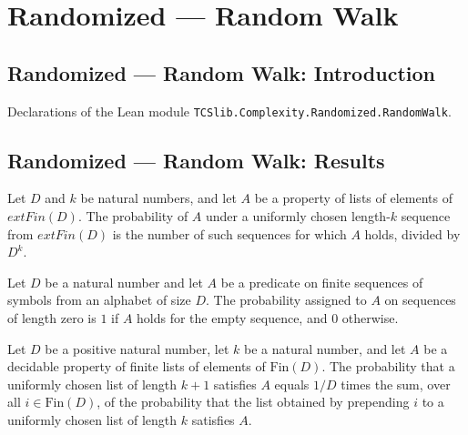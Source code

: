 \section{Randomized --- Random Walk}
\subsection*{Randomized --- Random Walk: Introduction}

Declarations of the Lean module \texttt{TCSlib.Complexity.Randomized.RandomWalk}.

\subsection*{Randomized --- Random Walk: Results}

\begin{definition}
\label{Randomized.idxProb}
\leanok
Let $D$ and $k$ be natural numbers, and let $A$ be a property of lists of elements of
$	ext{Fin}(D)$. The probability of $A$ under a uniformly chosen length-$k$ sequence from
$	ext{Fin}(D)$ is the number of such sequences for which $A$ holds, divided by $D^k$.
\end{definition}

\begin{theorem}
\label{Randomized.idxProb_zero}
\leanok
{}
Let $D$ be a natural number and let $A$ be a predicate on finite sequences of symbols
from an alphabet of size $D$. The probability assigned to $A$ on sequences of length
zero is $1$ if $A$ holds for the empty sequence, and $0$ otherwise.
\end{theorem}

\begin{theorem}
\label{Randomized.idxProb_succ}
\leanok
{}
Let $D$ be a positive natural number, let $k$ be a natural number, and let $A$ be a
decidable property of finite lists of elements of $\text{Fin}(D)$. The probability that
a uniformly chosen list of length $k+1$ satisfies $A$ equals $1/D$ times the sum, over
all $i\in\text{Fin}(D)$, of the probability that the list obtained by prepending $i$ to
a uniformly chosen list of length $k$ satisfies $A$.
\end{theorem}

